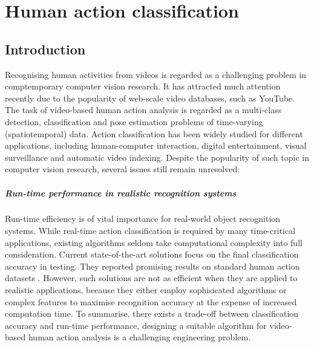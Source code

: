 \chapter{Human action classification}
\label{chap/act}

\section{Introduction}
\label{sec/act/intro}

Recognising human activities from videos is regarded as a challenging problem in comptemporary computer vision research. It has attracted much attention recently due to the popularity of web-scale video databases, such as YouTube. The task of video-based human action analysis is regarded as a multi-class detection, classification and pose estimation problems of time-varying (spatiotemporal) data.  Action classification has been widely studied for different applications, including human-computer interaction, digital entertainment, visual surveillance and automatic video indexing. Despite the popularity of such topic in computer vision research, several issues still remain unresolved:   

\paragraph{Run-time performance in realistic recognition systems} Run-time efficiency is of vital importance for real-world object recognition systems. While real-time action classification is required by many time-critical applications, existing algorithms seldom take computational complexity into full consideration. Current state-of-the-art solutions focus on the final classification accuracy in testing. They reported promising results on standard human action datasets \cite{Kim2007, Lin2009, Liu2008, Willems2009}. However, such solutions are not as efficient when they are applied to realistic applications, because they either employ sophisicated algorithms or complex features to maximise recognition accuracy at the expense of increased computation time. To summarise, there exists a trade-off between classification accuracy and run-time performance, designing a suitable algorithm for video-based human action analysis is a challenging engineering problem.  

